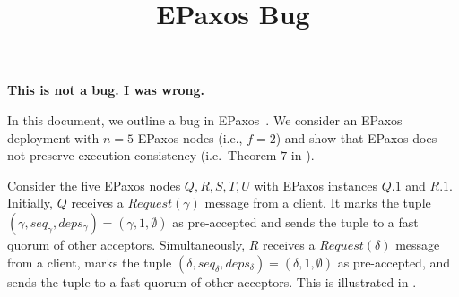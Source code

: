 \documentclass{mwhittaker}
\title{EPaxos Bug}
\begin{document}
\maketitle

\begin{center}
  \textbf{This is not a bug. I was wrong.}
\end{center}

In this document, we outline a bug in EPaxos~\cite{moraru2013there,
moraru2013proof}. We consider an EPaxos deployment with $n = 5$ EPaxos nodes
(i.e., $f = 2$) and show that EPaxos does not preserve execution consistency
(i.e.\ Theorem $7$ in \cite{moraru2013proof}).

Consider the five EPaxos nodes $Q, R, S, T, U$ with EPaxos instances $Q.1$ and
$R.1$. Initially, $Q$ receives a $Request(\gamma)$ message from a client. It
marks the tuple $(\gamma, seq_\gamma, deps_\gamma) = (\gamma, 1, \emptyset)$ as
pre-accepted and sends the tuple to a fast quorum of other acceptors.
%
Simultaneously, $R$ receives a $Request(\delta)$ message from a client, marks
the tuple $(\delta, seq_\delta, deps_\delta) = (\delta, 1, \emptyset)$ as
pre-accepted, and sends the tuple to a fast quorum of other acceptors.
%
This is illustrated in .
\end{document}
